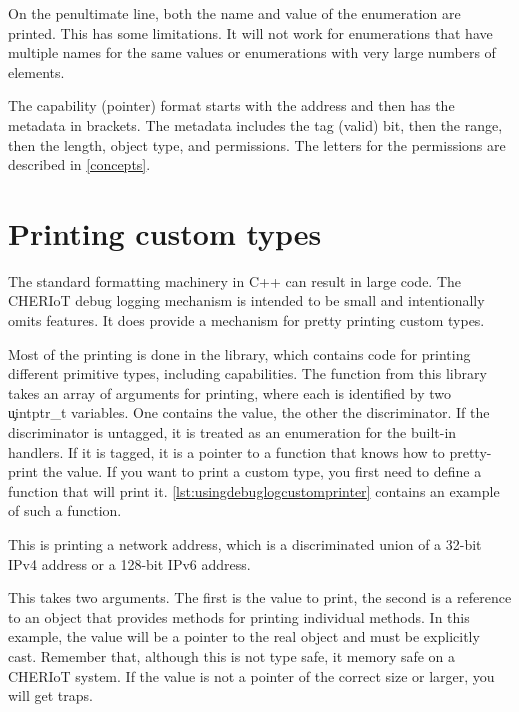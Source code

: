 {On the penultimate line, both the name and value of the enumeration are printed.
This has some limitations.
It will not work for enumerations that have multiple names for the same values or enumerations with very large numbers of elements.

The capability (pointer) format starts with the address and then has the metadata in brackets.
The metadata includes the tag (valid) bit, then the range, then the length, object type, and permissions.
The letters for the permissions are described in \ref{concepts}.

\section{Printing custom types}

The standard formatting machinery in C++ can result in large code.
The CHERIoT debug logging mechanism is intended to be small and intentionally omits features.
It does provide a mechanism for pretty printing custom types.

Most of the printing is done in the  library, which contains code for printing different primitive types, including capabilities.
The function from this library takes an array of arguments for printing, where each is identified by two \c{uintptr_t} variables.
One contains the value, the other the discriminator.
If the discriminator is untagged, it is treated as an enumeration for the built-in handlers.
If it is tagged, it is a pointer to a function that knows how to pretty-print the value.
If you want to print a custom type, you first need to define a function that will print it.
\ref{lst:usingdebuglogcustomprinter} contains an example of such a function.

This is printing a network address, which is a discriminated union of a 32-bit IPv4 address or a 128-bit IPv6 address.

\codelisting[filename=examples/debug_helpers/example.cc,marker=printer,label=lst:usingdebuglogcustomprinter,caption="Defining a print function for a custom type."]{}

This takes two arguments.
The first is the value to print, the second is a reference to an object that provides methods for printing individual methods.
In this example, the value will be a pointer to the real object and must be explicitly cast.
Remember that, although this is not type safe, it  memory safe on a CHERIoT system.
If the value is not a pointer of the correct size or larger, you will get traps.

}
